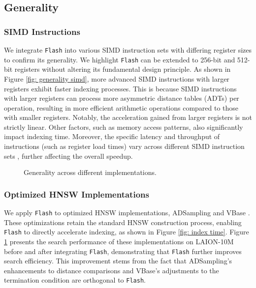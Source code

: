 \subsection{Generality}
\label{subsec: generality}
\subsubsection{{\textbf{SIMD Instructions}}}
\label{subsubsec: simd instructions}
{We integrate \texttt{Flash} into various SIMD instruction sets with differing register sizes to confirm its generality. We highlight \texttt{Flash} can be extended to 256-bit and 512-bit registers without altering its fundamental design principle. As shown in Figure \ref{fig: generality simd}, more advanced SIMD instructions with larger registers exhibit faster indexing processes. This is because SIMD instructions with larger registers can process more asymmetric distance tables (ADTs) per operation, resulting in more efficient arithmetic operations compared to those with smaller registers. Notably, the acceleration gained from larger registers is not strictly linear. Other factors, such as memory access patterns, also significantly impact indexing time. Moreover, the specific latency and throughput of instructions (such as register load times) vary across different SIMD instruction sets \cite{Intel-SIMD}, further affecting the overall speedup.}

\begin{figure}
\vspace{-0.2cm}
  \setlength{\abovecaptionskip}{0cm}
  \setlength{\belowcaptionskip}{0cm}
  \centering
  \footnotesize
  \hspace{0.15cm}
  \newline
  \caption{{Generality across different implementations.}}
  \label{fig: generality impl}
  \vspace{-0.2cm}
\end{figure}

\subsubsection{\textbf{{Optimized HNSW Implementations}}}
\label{subsubsec: opt hnsw impl}
{We apply \texttt{Flash} to optimized HNSW implementations, ADSampling \cite{ADSampling} and VBase \cite{zhang2023vbase}. These optimizations retain the standard HNSW construction process, enabling \texttt{Flash} to directly accelerate indexing, as shown in Figure \ref{fig: index time}. Figure \ref{fig: generality impl} presents the search performance of these implementations on LAION-10M before and after integrating \texttt{Flash}, demonstrating that \texttt{Flash} further improves search efficiency. This improvement stems from the fact that ADSampling’s enhancements to distance comparisons and VBase’s adjustments to the termination condition are orthogonal to \texttt{Flash}.}

